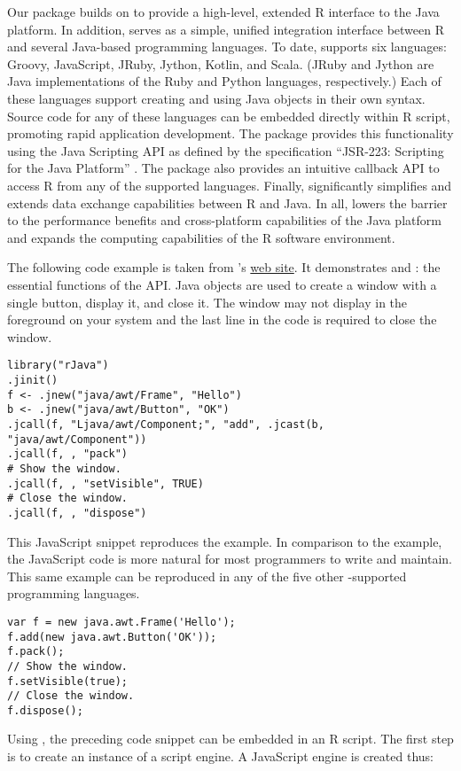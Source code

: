 Our  package builds on  to provide a high-level, extended R interface to the Java platform. In addition,  serves as a simple, unified integration interface between R and several Java-based programming languages. To date,  supports six languages: Groovy, JavaScript, JRuby, Jython, Kotlin, and Scala. (JRuby and Jython are Java implementations of the Ruby and Python languages, respectively.) Each of these languages support creating and using Java objects in their own syntax. Source code for any of these languages can be embedded directly within R script, promoting rapid application development. The  package provides this functionality using the Java Scripting API \citep{jsa} as defined by the specification “JSR-223: Scripting for the Java Platform” \citep{jsr223spec}. The  package also provides an intuitive callback API to access R from any of the supported languages. Finally,  significantly simplifies and extends data exchange capabilities between R and Java. In all,  lowers the barrier to the performance benefits and cross-platform capabilities of the Java platform and expands the computing capabilities of the R software environment.

The following code example is taken from 's \href{http://www.rforge.net/rJava/}{web site}. It demonstrates  and : the essential functions of the  API. Java objects are used to create a window with a single button, display it, and close it.  The window may not display in the foreground on your system and the last line in the code is required to close the window.

\begin{verbatim}
library("rJava")
.jinit()
f <- .jnew("java/awt/Frame", "Hello")
b <- .jnew("java/awt/Button", "OK")
.jcall(f, "Ljava/awt/Component;", "add", .jcast(b, "java/awt/Component"))
.jcall(f, , "pack")
# Show the window.
.jcall(f, , "setVisible", TRUE)
# Close the window.
.jcall(f, , "dispose")
\end{verbatim}
This JavaScript snippet reproduces the  example. In comparison to the  example, the JavaScript code is more natural for most programmers to write and maintain. This same example can be reproduced in any of the five other -supported programming languages.

\begin{verbatim}
var f = new java.awt.Frame('Hello');
f.add(new java.awt.Button('OK'));
f.pack();
// Show the window.
f.setVisible(true);
// Close the window.
f.dispose();
\end{verbatim}
Using , the preceding code snippet can be embedded in an R script. The first step is to create an instance of a script engine. A JavaScript engine is created thus:


